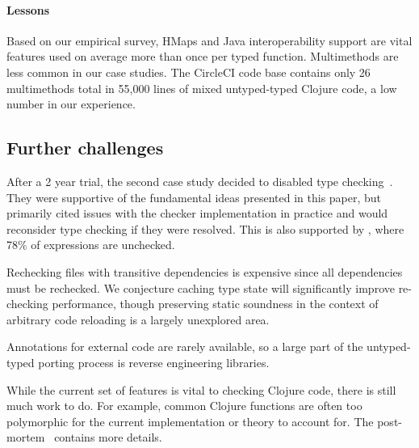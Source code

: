 \paragraph{Lessons}
Based on our empirical survey, HMaps and Java interoperability support
are vital features used on average more than once per typed
function. 
%
Multimethods are less common
in our case studies. The CircleCI code base contains only 26 multimethods total
in 55,000 lines of mixed untyped-typed Clojure code,
a low number in our experience.


%

\subsection{Further challenges}
\label{sec:limitations}

After a 2 year trial, the second case study decided to disabled type checking~\cite{CircleCIBlog}.
They were supportive of the fundamental ideas presented in this paper, but primarily
cited issues with the checker implementation in practice and would reconsider
type checking if they were resolved. This is also supported by ,
where 78\% of  expressions are unchecked.

Rechecking files with transitive dependencies is expensive since all dependencies must be rechecked.
We conjecture caching type state will significantly
improve re-checking performance,
though preserving static soundness in the context of arbitrary code reloading is a largely unexplored area.

Annotations for external code are rarely available, so a large part of the
untyped-typed porting process is reverse engineering libraries.

While the current set of features is vital to checking Clojure code,
there is still much work to do.
For example, common Clojure functions are often too polymorphic for the current implementation
or theory to account for. The post-mortem~\cite{CircleCIBlog} contains more details.

